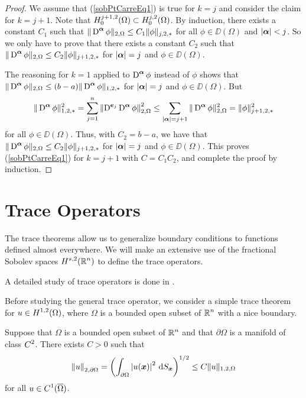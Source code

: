 \begin{proof}
We assume that (\ref{sobPtCarreEq1}) is true for $k=j$ and consider the claim
for $k=j+1$.  Note that
$\displaystyle H^{j+1,2}_0(\Omega) \subset H^{j,2}_0(\Omega)$.
By induction, there exists a constant $C_1$ such that
$\displaystyle \| \operatorname{D}^{{\bm{\alpha}}} \phi \|_{2,\Omega}
\leq C_1 \|\phi\|_{j,2,\ast}$ for 
all $\phi \in \DD(\Omega)$ and $|{\bm{\alpha}}| < j$.  So we only have
to prove that there exists a constant $C_2$ such that
$\displaystyle \| \operatorname{D}^{{\bm{\alpha}}} \phi \|_{2,\Omega}
\leq C_2 \|\phi\|_{j+1,2,\ast}$ for
$|{\bm{\alpha}}|=j$ and $\phi \in \DD(\Omega)$.

The reasoning for $k=1$ applied to $\displaystyle \operatorname{D}^{{\bm{\alpha}}} \phi$
instead of $\phi$ shows
that $\displaystyle \|\operatorname{D}^{{\bm{\alpha}}} \phi\|_{2,\Omega} \leq
(b-a) \| \operatorname{D}^{{\bm{\alpha}}} \phi \|_{1,2,\ast}$
for $|{\bm{\alpha}}|=j$ and $\phi \in \DD(\Omega)$.  But
\[
\| \operatorname{D}^{{\bm{\alpha}}} \phi \|_{1,2,\ast}^2 = 
\sum_{j=1}^n \left\| \operatorname{D}^{{\bm{e}}_j} \operatorname{D}^{{\bm{\alpha}}}
\phi \right\|_{2,\Omega}^2 \leq
\sum_{|{\bm{\alpha}}|=j+1} \| \operatorname{D}^{{\bm{\alpha}}} \phi \|_{2,\Omega}^2
= \|\phi\|_{j+1,2,\ast}^2
\]
for all $\phi \in \DD(\Omega)$.  Thus, with $C_2=b-a$, we have that
$\displaystyle \| \operatorname{D}^{{\bm{\alpha}}} \phi \|_{2,\Omega}
\leq C_2 \|\phi\|_{j+1,2,\ast}$ for
$|{\bm{\alpha}}|=j$ and $\phi \in \DD(\Omega)$.
This proves (\ref{sobPtCarreEq1}) for $k=j+1$ with $C=C_1 C_2$, and
complete the proof by induction.
\end{proof}

\section{Trace Operators} \label{sectTraceOp}

The trace theorems allow us to generalize boundary conditions to
functions defined almost everywhere.  We will make an extensive use of
the fractional Sobolev spaces $\displaystyle H^{s,2}(\mathbb{R}^n)$ to define
the trace operators.

A detailed study of trace operators is done in \cite{LiMa1}.

Before studying the general trace operator, we consider a simple trace
theorem for $\displaystyle u \in H^{1,2}(\Omega)$, where $\Omega$ is a
bounded open subset of $\displaystyle \mathbb{R}^n$ with a nice boundary.

\begin{prop}
Suppose that $\Omega$ is a bounded open subset of $\displaystyle \mathbb{R}^n$ and that
$\partial \Omega$ is a manifold of class $\displaystyle C^2$.  There
exists $C>0$ such that
\[
\left\| u \right\|_{2,\partial \Omega}
= \left( \int_{\partial \Omega} \left|u({\bm{x}})\right|^2
\,\mathrm{d}{S}_{{\bm{x}}} \right)^{1/2}
\leq C \| u\|_{1,2,\Omega}
\]
for all $\displaystyle u \in C^1(\overline{\Omega})$.
\end{prop}

